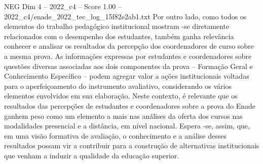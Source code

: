 \begin{textsample}{NEG Dim 4 – 2022\_c4 – Score 1.00 – 2022\_c4/enade\_2022\_tec\_log\_15f82e2ab1.txt}
Por outro lado, como todos os elementos do trabalho pedagógico institucional mostram -se diretamente relacionados com o desempenho dos estudantes, também ganha relevância conhecer e analisar os resultados da percepção dos coordenadores de curso sobre a mesma prova.
As informações expressas por estudantes e coordenadores sobre questões diversas associadas aos dois componentes da prova – Formação Geral e Conhecimento Específico – podem agregar valor a ações institucionais voltadas para o aperfeiçoamento do instrumento avaliativo, considerando os vários elementos envolvidos em sua elaboração.
Neste contexto, é relevante que os resultados das percepções de estudantes e coordenadores sobre a prova do Enade ganhem peso como um elemento a mais nas análises da oferta dos cursos nas modalidades presencial e a distância, em nível nacional.
Espera -se, assim, que, em uma visão formativa de avaliação, o conhecimento e a análise desses resultados possam vir a contribuir para a construção de alternativas institucionais que venham a induzir a qualidade da educação superior.

\end{textsample}

